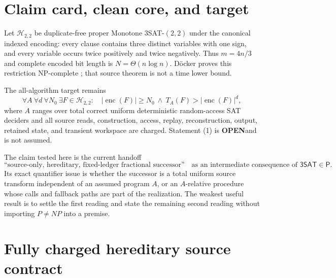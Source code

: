 \documentclass[11pt]{article}
\newcommand{\SAT}{\mathsf{3SAT}}
\newcommand{\Htwo}{\mathcal H_{2,2}}
\newcommand{\OPEN}{\textbf{OPEN}}
\begin{document}
\section{Claim card, clean core, and target}

Let $\Htwo$ be duplicate-free proper Monotone $3$SAT-$(2,2)$ under the
canonical indexed encoding: every clause contains three distinct variables
with one sign, and every variable occurs twice positively and twice
negatively.  Thus $m=4n/3$ and complete encoded bit length is
$N=\Theta(n\log n)$.  D\"ocker proves this restriction NP-complete
\cite{doecker}; that source theorem is not a time lower bound.

The all-algorithm target remains
\[
 \forall A\ \forall d\ \forall N_0\ \exists F\in\Htwo:\quad
 |\operatorname{enc}(F)|\ge N_0
 \ \land\ T_A(F)>|\operatorname{enc}(F)|^d,              \tag{1}
\]
where $A$ ranges over total correct uniform deterministic random-access SAT
deciders and all source reads, construction, access, replay, reconstruction,
output, retained state, and transient workspace are charged.  Statement (1)
is \OPEN and is not assumed.

The claim tested here is the current handoff
\[
 \text{``source-only, hereditary, fixed-ledger fractional successor''}
 \quad\text{as an intermediate consequence of }\SAT\in\mathsf P. \tag{2}
\]
Its exact quantifier issue is whether the successor is a total uniform
source transform independent of an assumed program $A$, or an $A$-relative
procedure whose calls and fallback paths are part of the realization.  The
weakest useful result is to settle the first reading and state the remaining
second reading without importing $P\ne NP$ into a premise.

\section{Fully charged hereditary source contract}
\end{document}
